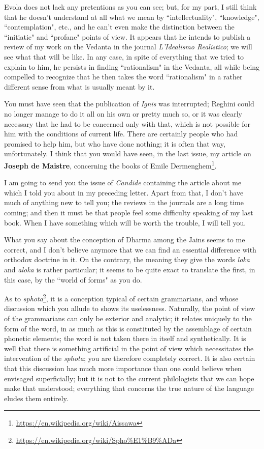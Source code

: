 Evola does not lack any pretentions as you can see; but, for my part, I still think that he doesn't understand at all what we mean by ``intellectuality", ``knowledge", ``contemplation", etc., and he can't even make the distinction between the ``initiatic" and ``profane" points of view. It appears that he intends to publish a review of my work on the Vedanta in the journal \emph{L'Idealismo Realistico}; we will see what that will be like. In any case, in spite of everything that we tried to explain to him, he persists in finding ``rationalism" in the Vedanta, all while being compelled to recognize that he then takes the word ``rationalism" in a rather different sense from what is usually meant by it.

You must have seen that the publication of \emph{Ignis} was interrupted; Reghini could no longer manage to do it all on his own or pretty much so, or it was clearly necessary that he had to be concerned only with that, which is not possible for him with the conditions of current life. There are certainly people who had promised to help him, but who have done nothing; it is often that way, unfortunately. I think that you would have seen, in the last issue, my article on \textbf{Joseph de Maistre}, concerning the books of Emile Dermenghem\footnote{\url{https://en.wikipedia.org/wiki/Aissawa}}.

I am going to send you the issue of \emph{Candide} containing the article about me which I told you about in my preceding letter. Apart from that, I don't have much of anything new to tell you; the reviews in the journals are a long time coming; and then it must be that people feel some difficulty speaking of my last book. When I have something which will be worth the trouble, I will tell you.

What you say about the conception of Dharma among the Jains seems to me correct, and I don't believe anymore that we can find an essential difference with orthodox doctrine in it. On the contrary, the meaning they give the words \emph{loka} and \emph{aloka} is rather particular; it seems to be quite exact to translate the first, in this case, by the ``world of forms" as you do.

As to \emph{sphota}\footnote{\url{https://en.wikipedia.org/wiki/Spho\%E1\%B9\%ADa}}, it is a conception typical of certain grammarians, and whose discussion which you allude to shows its uselessness. Naturally, the point of view of the grammarians can only be exterior and analytic; it relates uniquely to the form of the word, in as much as this is constituted by the assemblage of certain phonetic elements; the word is not taken there in itself and synthetically. It is well that there is something artificial in the point of view which necessitates the intervention of the \emph{sphota}; you are therefore completely correct. It is also certain that this discussion has much more importance than one could believe when envisaged superficially; but it is not to the current philologists that we can hope make that understood; everything that concerns the true nature of the language eludes them entirely.

